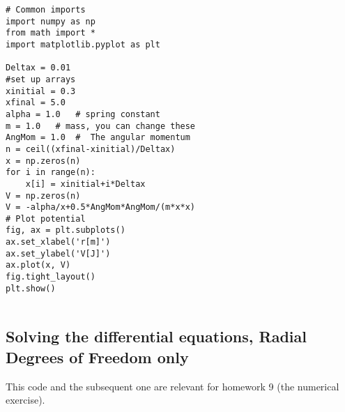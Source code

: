 \documentclass[%
oneside,                 %
final,                   %
10pt]{article}
\begin{document}
\begin{verbatim}
# Common imports
import numpy as np
from math import *
import matplotlib.pyplot as plt

Deltax = 0.01
#set up arrays
xinitial = 0.3
xfinal = 5.0
alpha = 1.0   # spring constant
m = 1.0   # mass, you can change these
AngMom = 1.0  #  The angular momentum
n = ceil((xfinal-xinitial)/Deltax)
x = np.zeros(n)
for i in range(n):
    x[i] = xinitial+i*Deltax
V = np.zeros(n)
V = -alpha/x+0.5*AngMom*AngMom/(m*x*x)
# Plot potential
fig, ax = plt.subplots()
ax.set_xlabel('r[m]')
ax.set_ylabel('V[J]')
ax.plot(x, V)
fig.tight_layout()
plt.show()


\end{verbatim}


\subsection*{Solving the differential equations, Radial Degrees of Freedom only}

This code and the subsequent one are relevant for homework 9 (the numerical exercise).
\end{document}
